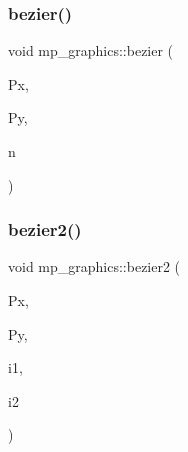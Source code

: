 \mbox{\label{classmp__graphics_a739b18e0fc5dd29310be04f6f12115c2}} 
\subsubsection{\texorpdfstring{bezier()}{bezier()}}
{\footnotesize\ttfamily void mp\+\_\+graphics\+::bezier (\begin{DoxyParamCaption}\item[{\mbox{\hyperlink{galois_8h_a09fddde158a3a20bd2dcadb609de11dc}{I\+NT}} $\ast$}]{Px,  }\item[{\mbox{\hyperlink{galois_8h_a09fddde158a3a20bd2dcadb609de11dc}{I\+NT}} $\ast$}]{Py,  }\item[{\mbox{\hyperlink{galois_8h_a09fddde158a3a20bd2dcadb609de11dc}{I\+NT}}}]{n }\end{DoxyParamCaption})}

\mbox{\label{classmp__graphics_a1d6961459b292c48ceeb937dff7fa691}} 
\subsubsection{\texorpdfstring{bezier2()}{bezier2()}}
{\footnotesize\ttfamily void mp\+\_\+graphics\+::bezier2 (\begin{DoxyParamCaption}\item[{\mbox{\hyperlink{galois_8h_a09fddde158a3a20bd2dcadb609de11dc}{I\+NT}} $\ast$}]{Px,  }\item[{\mbox{\hyperlink{galois_8h_a09fddde158a3a20bd2dcadb609de11dc}{I\+NT}} $\ast$}]{Py,  }\item[{\mbox{\hyperlink{galois_8h_a09fddde158a3a20bd2dcadb609de11dc}{I\+NT}}}]{i1,  }\item[{\mbox{\hyperlink{galois_8h_a09fddde158a3a20bd2dcadb609de11dc}{I\+NT}}}]{i2 }\end{DoxyParamCaption})}

\mbox{\label{classmp__graphics_a973f653e7855ad3fcff21e07a56c1e10}} 
